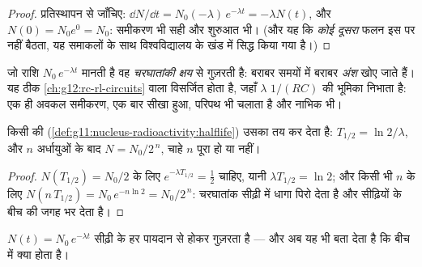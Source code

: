 \begin{proof}
प्रतिस्थापन से जाँचिए: $\dd N/\dd t = N_0(-\lambda)\,e^{-\lambda t} = -\lambda N(t)$, और $N(0) = N_0 e^0 = N_0$: समीकरण भी सही और शुरुआत भी। (और यह
कि \emph{कोई दूसरा} फलन इस पर नहीं बैठता, यह समाकलों के साथ विश्वविद्यालय के
खंड में सिद्ध किया गया है।)
\end{proof}

\begin{definition}[चरघातांकी क्षय]\label{def:g12:radioactive-decay:exponential}
जो राशि $N_0\,e^{-\lambda t}$ मानती है वह \emph{चरघातांकी क्षय} से
गुज़रती है: बराबर समयों में बराबर \emph{अंश} खोए जाते हैं। यह ठीक \cref{ch:g12:rc-rl-circuits} वाला
विसर्जित होता  है, जहाँ $\lambda$ $1/(RC)$ की भूमिका निभाता है:
एक ही अवकल समीकरण, एक बार सीखा हुआ, परिपथ भी चलाता है और नाभिक भी।
\end{definition}

\begin{proposition}[अर्धायु]\label{prop:g12:radioactive-decay:halflife}
किसी  की  (\cref{def:g11:nucleus-radioactivity:halflife}) उसका
 तय कर देता है: $T_{1/2} = \ln 2/\lambda$, और $n$ अर्धायुओं के बाद $N = N_0/2^{\,n}$,
चाहे $n$ पूरा हो या नहीं।
\end{proposition}

\begin{proof}
$N(T_{1/2}) = N_0/2$ के लिए $e^{-\lambda T_{1/2}} = \tfrac12$ चाहिए, यानी $\lambda T_{1/2} = \ln 2$; और किसी भी $n$ के लिए $N(n\,T_{1/2}) = N_0\,e^{-n\ln 2} =
N_0/2^{\,n}$:
चरघातांक सीढ़ी में धागा पिरो देता है और सीढ़ियों के बीच की जगह भर देता है।
\end{proof}

\begin{omfigure}

{\small $N(t) = N_0\,e^{-\lambda t}$ सीढ़ी के हर पायदान से होकर गुज़रता है --- और अब यह भी बता देता है
कि बीच में क्या होता है।}
\end{omfigure}

